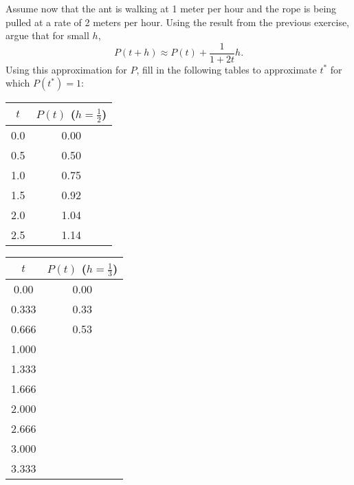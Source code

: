 \problem Assume now that the ant is walking at 1 meter per hour and
the rope is being pulled at a rate of 2 meters per hour.  Using the
result from the previous exercise, argue that for small $h$,
\begin{equation}\label{eq:approx}
  P(t + h) \approx P(t) + \frac{1}{1 + 2t} h.
\end{equation}
Using this approximation for $P$, fill in the following tables to
approximate $t^*$ for which $P(t^*) = 1$:

\begin{minipage}[b]{0.3\textwidth}
  \begin{tabular}{cc}\toprule
    $t$ & $P(t)$ ($h = \frac12$)\\ \toprule
    0.0 & 0.00 \\ \midrule
    0.5 & 0.50  \\ \midrule
    1.0 & 0.75 \\ \midrule
    1.5 & 0.92 \\ \midrule
    2.0 & 1.04 \\ \midrule
    2.5 & 1.14\\ \bottomrule
  \end{tabular}
\end{minipage}
\begin{minipage}[b]{0.3\textwidth}
  \begin{tabular}{cc}\toprule
    $t$ & $P(t)$  ($h = \frac13$)\\ \toprule
    0.00 & 0.00 \\ \midrule
    0.333 & 0.33   \\ \midrule
    0.666 &  0.53 \\ \midrule
    1.000 &  \\ \midrule
    1.333 &  \\ \midrule
    1.666 &  \\ \midrule
    2.000 &  \\ \midrule
    2.666 &  \\ \midrule
    3.000 & \\ \midrule
    3.333 & \\ \bottomrule
  \end{tabular} 
\end{minipage}
